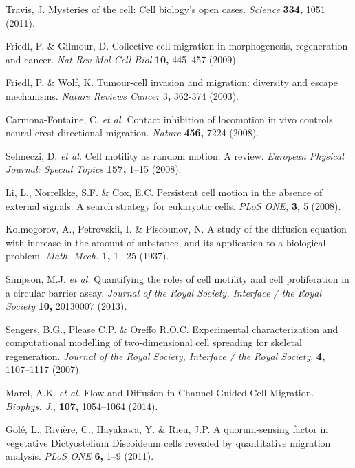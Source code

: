 \documentclass[11pt, twocolumn]{article}
\begin{document}


\begin{thebibliography}{10}
Travis, J. Mysteries of the cell: Cell biology's open cases.
 \emph{Science} \textbf{334,} 1051 (2011).

Friedl, P. \& Gilmour, D. Collective cell migration in morphogenesis, regeneration and cancer.
 {\em Nat Rev Mol Cell Biol} \textbf{10,} 445--457 (2009).

Friedl, P. \& Wolf, K. Tumour-cell invasion and migration: diversity and escape mechanisms. \textit{Nature Reviews Cancer} 3\textbf{,} 362-374 (2003).

Carmona-Fontaine, C. \textit{et al.} Contact inhibition of locomotion in vivo controls neural crest directional migration. \textit{Nature} \textbf{456,} 7224 (2008).

Selmeczi, D. \textit{et al.} Cell motility as random motion: A review.
 {\em European Physical Journal: Special Topics} \textbf{157,} 1--15 (2008).
 
Li, L., Norrelkke, S.F. \& Cox, E.C. Persistent cell motion in the absence of external signals: A search  strategy for eukaryotic cells.
 {\em PLoS ONE}, \textbf{3,} 5 (2008).

Kolmogorov, A., Petrovskii, I. \& Piscounov, N. A study of the diffusion equation with increase in the amount of substance, and its application to a biological problem.
  {\em Math. Mech.} \textbf{1,} 1-–25 (1937).

Simpson, M.J. \textit{et al.} Quantifying the roles of cell motility and cell proliferation in a circular barrier assay.
 {\em Journal of the Royal Society, Interface / the Royal Society} \textbf{10,} 20130007 (2013).

Sengers, B.G., Please C.P. \& Oreffo R.O.C. Experimental characterization and computational modelling of two-dimensional cell spreading for skeletal regeneration.
{\em Journal of the Royal Society, Interface / the Royal Society}, \textbf{4,} 1107--1117 (2007).

Marel, A.K. \textit{et al.} Flow and Diffusion in Channel-Guided Cell Migration.
 {\em Biophys. J.}, \textbf{107,} 1054--1064 (2014).

Gol\'{e}, L., Rivi\`{e}re, C., Hayakawa, Y. \& Rieu, J.P. A quorum-sensing factor in vegetative Dictyostelium Discoideum cells revealed by quantitative migration analysis.
 {\em PLoS ONE} \textbf{6,} 1--9 (2011).


\end{thebibliography}
\end{document}

